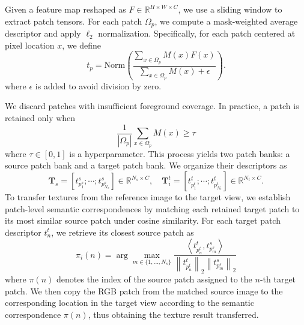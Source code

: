 \documentclass{article}
\begin{document}
Given a feature map reshaped as $F \in \mathbb{R}^{H \times W \times C}$, we use a sliding window to extract patch tensors. For each patch $\Omega_p$, we compute a mask-weighted average descriptor and apply $\ell_2$ normalization. Specifically, for each patch centered at pixel location $x$, we define
\begin{equation}
t_p = \mathrm{Norm}\!\left(
\frac{\sum_{x \in \Omega_p} M(x) F(x)}{\sum_{x \in \Omega_p} M(x) + \epsilon}
\right).
\end{equation}
where $\epsilon$ is added to avoid division by zero.

We discard patches with insufficient foreground coverage. In practice, a patch is retained only when
\begin{equation}
\frac{1}{|\Omega_p|} \sum_{x \in \Omega_p} M(x) \ge \tau
\end{equation}
where $\tau \in [0,1]$ is a hyperparameter.
This process yields two patch banks: a source patch bank and a target patch bank. We organize their descriptors as
\begin{equation}
\mathbf{T}_s =
\left[
t_{p_1^s}^{s};
\cdots;
t_{p_{N_s}^s}^{s}
\right]
\in \mathbb{R}^{N_s \times C},
\quad
\mathbf{T}_i^t =
\left[
t_{p_1^t}^{t};
\cdots;
t_{p_{N_t}^t}^{t}
\right]
\in \mathbb{R}^{N_t \times C}.
\end{equation}
To transfer textures from the reference image to the target view, we establish patch-level semantic correspondences by matching each retained target patch to its most similar source patch under cosine similarity. For each target patch descriptor $t_n^t$, we retrieve its closest source patch as
\begin{equation}
\pi_i(n)
=
\arg\max_{m \in \{1,\ldots,N_s\}}
\frac{
\left\langle t_{p_n^t}^{t}, t_{p_m^s}^{s} \right\rangle
}{
\left\|t_{p_n^t}^{t}\right\|_2
\left\|t_{p_m^s}^{s}\right\|_2
}
\end{equation}
where $\pi(n)$ denotes the index of the source patch assigned to the $n$-th target patch.
We then copy the RGB patch from the matched source image to the corresponding location in the target view according to the semantic correspondence $\pi(n)$, thus obtaining the texture result transferred.
\end{document}
